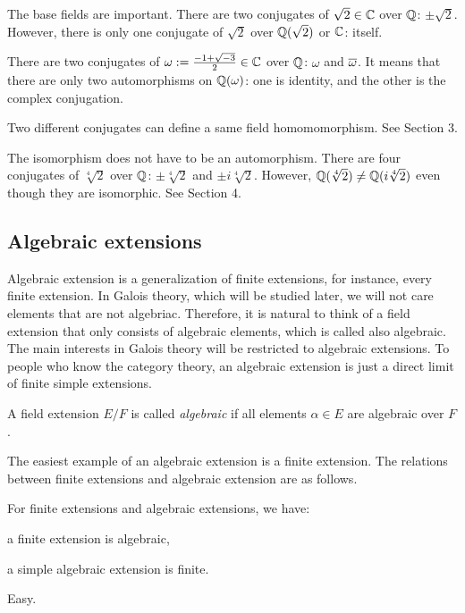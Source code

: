 \documentclass{../exp}
\begin{document}
\begin{ex}
The base fields are important.
There are two conjugates of $\sqrt2\in\mathbb{C}$ over $\mathbb{Q}$: $\pm\sqrt2$.
However, there is only one conjugate of $\sqrt2$ over $\mathbb{Q}(\sqrt2)$ or $\mathbb{C}$: itself.
\end{ex}
\begin{ex}
There are two conjugates of $\omega:=\frac{-1+\sqrt{-3}}2\in\mathbb{C}$ over $\mathbb{Q}$: $\omega$ and $\overline\omega$.
It means that there are only two automorphisms on $\mathbb{Q}(\omega)$: one is identity, and the other is the complex conjugation.
\end{ex}
\begin{ex}
Two different conjugates can define a same field homomomorphism.
See Section 3.
\end{ex}
\begin{ex}
The isomorphism does not have to be an automorphism.
There are four conjugates of $\sqrt[4]2$ over $\mathbb{Q}$: $\pm\sqrt[4]2$ and $\pm i\sqrt[4]2$.
However, $\mathbb{Q}(\sqrt[4]2)\ne\mathbb{Q}(i\sqrt[4]2)$ even though they are isomorphic.
See Section 4.
\end{ex}




\subsection{Algebraic extensions}

Algebraic extension is a generalization of finite extensions, for instance, every finite extension.
In Galois theory, which will be studied later, we will not care elements that are not algebriac.
Therefore, it is natural to think of a field extension that only consists of algebraic elements, which is called also algebraic.
The main interests in Galois theory will be restricted to algebraic extensions.
To people who know the category theory, an algebraic extension is just a direct limit of finite simple extensions.

\begin{defn}
A field extension $E/F$ is called \emph{algebraic} if all elements $\alpha\in E$ are algebraic over $F$.
\end{defn}

The easiest example of an algebraic extension is a finite extension.
The relations between finite extensions and algebraic extension are as follows.

\begin{prop}
For finite extensions and algebraic extensions, we have:
\begin{cond}
\item a finite extension is algebraic,
\item a simple algebraic extension is finite.
\end{cond}
\end{prop}
\begin{pf} Easy. \end{pf}
\end{document}
